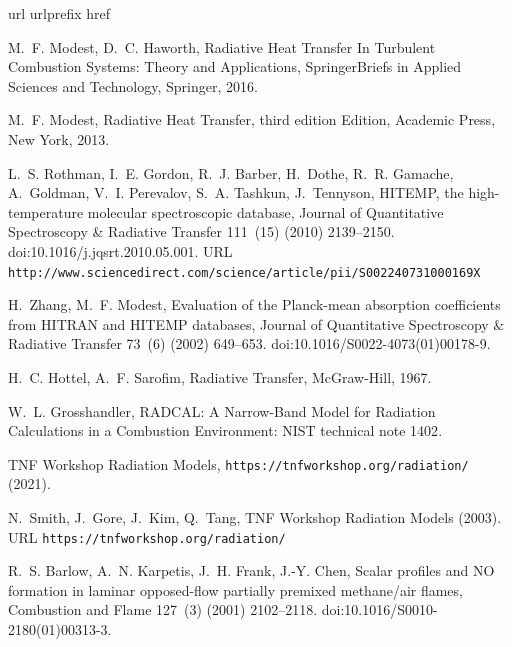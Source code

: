 \documentclass[preprint,12pt]{elsarticle}
\begin{document}
\begin{thebibliography}{10}
\expandafter\ifx\csname url\endcsname\relax
  \def\url#1{\texttt{#1}}\fi
\expandafter\ifx\csname urlprefix\endcsname\relax\def\urlprefix{URL }\fi
\expandafter\ifx\csname href\endcsname\relax
  \def\href#1#2{#2} \def\path#1{#1}\fi

M.~F. Modest, D.~C. Haworth, {Radiative Heat Transfer In Turbulent Combustion
  Systems: Theory and Applications}, {SpringerBriefs in Applied Sciences and
  Technology}, Springer, 2016.

M.~F. Modest, {Radiative Heat Transfer}, third edition Edition, {Academic
  Press}, New York, 2013.

L.~S. Rothman, I.~E. Gordon, R.~J. Barber, H.~Dothe, R.~R. Gamache, A.~Goldman,
  V.~I. Perevalov, S.~A. Tashkun, J.~Tennyson,
  \href{http://www.sciencedirect.com/science/article/pii/S002240731000169X}{{{HITEMP},
  the high-temperature molecular spectroscopic database}}, {Journal of
  Quantitative Spectroscopy {\&} Radiative Transfer} 111~(15) (2010)
  2139--2150.
\newblock \href {http://dx.doi.org/10.1016/j.jqsrt.2010.05.001}
  {\path{doi:10.1016/j.jqsrt.2010.05.001}}.
\newline\urlprefix\url{http://www.sciencedirect.com/science/article/pii/S002240731000169X}

H.~Zhang, M.~F. Modest, {Evaluation of the Planck-mean absorption coefficients
  from HITRAN and HITEMP databases}, {Journal of Quantitative Spectroscopy {\&}
  Radiative Transfer} 73~(6) (2002) 649--653.
\newblock \href {http://dx.doi.org/10.1016/S0022-4073(01)00178-9}
  {\path{doi:10.1016/S0022-4073(01)00178-9}}.

H.~C. Hottel, A.~F. Sarofim, {Radiative Transfer}, McGraw-Hill, 1967.

W.~L. Grosshandler, {{RADCAL}: A Narrow-Band Model for Radiation Calculations
  in a Combustion Environment: NIST technical note 1402}.

{TNF Workshop Radiation Models}, \url{https://tnfworkshop.org/radiation/}
  (2021).

N.~Smith, J.~Gore, J.~Kim, Q.~Tang,
  \href{https://tnfworkshop.org/radiation/}{{{TNF} Workshop Radiation Models}}
  (2003).
\newline\urlprefix\url{https://tnfworkshop.org/radiation/}

R.~S. Barlow, A.~N. Karpetis, J.~H. Frank, J.-Y. Chen, {Scalar profiles and
  {NO} formation in laminar opposed-flow partially premixed methane/air
  flames}, {Combustion and Flame} 127~(3) (2001) 2102--2118.
\newblock \href {http://dx.doi.org/10.1016/S0010-2180(01)00313-3}
  {\path{doi:10.1016/S0010-2180(01)00313-3}}.


\end{thebibliography}
\end{document}
